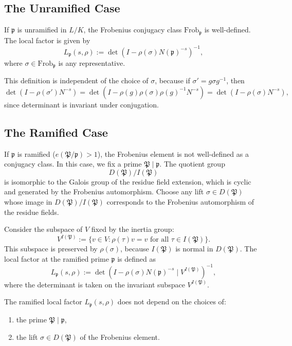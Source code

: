 \subsection{The Unramified Case}

If \(\mathfrak{p}\) is unramified in \(L/K\), the Frobenius conjugacy class \(\mathrm{Frob}_{\mathfrak{p}}\) is well-defined. The local factor is given by
\[
L_{\mathfrak{p}}(s, \rho) := \det\!\left( I - \rho(\sigma) N(\mathfrak{p})^{-s} \right)^{-1},
\]
where \(\sigma \in \mathrm{Frob}_{\mathfrak{p}}\) is any representative.

\begin{remark}
This definition is independent of the choice of \(\sigma\), because if \(\sigma' = g\sigma g^{-1}\), then
\[
\det(I - \rho(\sigma') N^{-s}) = \det(I - \rho(g)\rho(\sigma)\rho(g)^{-1} N^{-s}) = \det(I - \rho(\sigma) N^{-s}),
\]
since determinant is invariant under conjugation.
\end{remark}

\subsection{The Ramified Case}

If \(\mathfrak{p}\) is ramified (\(e(\mathfrak{P}/\mathfrak{p}) > 1\)), the Frobenius element is not well-defined as a conjugacy class. In this case, we fix a prime \(\mathfrak{P} \mid \mathfrak{p}\). The quotient group
\[
D(\mathfrak{P}) / I(\mathfrak{P})
\]
is isomorphic to the Galois group of the residue field extension, which is cyclic and generated by the Frobenius automorphism. Choose any lift \(\sigma \in D(\mathfrak{P})\) whose image in \(D(\mathfrak{P})/I(\mathfrak{P})\) corresponds to the Frobenius automorphism of the residue fields.

Consider the subspace of \(V\) fixed by the inertia group:
\[
V^{I(\mathfrak{P})} := \{ v \in V : \rho(\tau)v = v \text{ for all } \tau \in I(\mathfrak{P}) \}.
\]
This subspace is preserved by \(\rho(\sigma)\), because \(I(\mathfrak{P})\) is normal in \(D(\mathfrak{P})\). The local factor at the ramified prime \(\mathfrak{p}\) is defined as
\[
L_{\mathfrak{p}}(s, \rho) := \det\!\left( I - \rho(\sigma) N(\mathfrak{p})^{-s} \mid V^{I(\mathfrak{P})} \right)^{-1},
\]
where the determinant is taken on the invariant subspace \(V^{I(\mathfrak{P})}\).

\begin{prop}
The ramified local factor \(L_{\mathfrak{p}}(s, \rho)\) does not depend on the choices of:
\begin{enumerate}
    \item the prime \(\mathfrak{P} \mid \mathfrak{p}\),
    \item the lift \(\sigma \in D(\mathfrak{P})\) of the Frobenius element.
\end{enumerate}
\end{prop}

